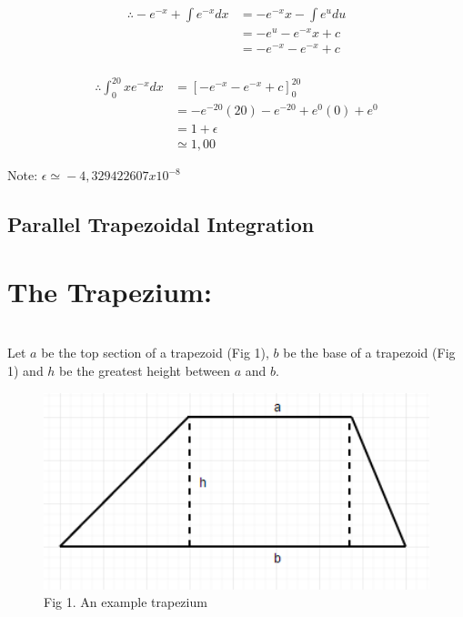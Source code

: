 \documentclass[11pt]{article}
\begin{document}
\begin{page}
\begin{equation}
\begin{aligned}
    \therefore{} -e^{-x} + \int e^{-x} dx &= -e^{-x}x - \int e^{u} du\\
    & = -e^{u} - e^{-x}x + c\\
    & = -e^{-x} - e^{-x} + c 
\end{aligned}
\end{equation}
\\

\begin{equation}
\begin{aligned}
    \therefore{} \int_{0}^{20} xe^{-x} dx &= \left[-e^{-x} - e^{-x} + c\right]_{0}^{20} \\
    & = -e^{-20}(20) - e^{-20} + e^{0}(0) + e^{0}\\
    & = 1 + \epsilon{}\\
    & \simeq{} 1,00
\end{aligned}
\end{equation}

Note: $\epsilon{} \simeq{} -4,329422607 x 10^{-8}$
\\

\section{Parallel Trapezoidal Integration}
\noindent \chapter{The Trapezium:}\\
\noindent Let $a$ be the top section of a trapezoid (Fig 1), $b$ be the base of a trapezoid (Fig 1) and $h$ be the greatest height between $a$ and $b$.

\begin{figure}[ht]
\centering
     \includegraphics[width=1.00\textwidth]{trapezium}\\
     Fig 1. An example trapezium
\end{figure}


\end{page}
\end{document}

